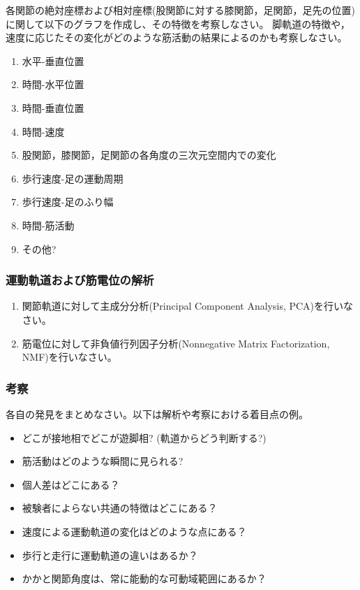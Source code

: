 \documentclass{jarticle}
\begin{document}
各関節の絶対座標および相対座標(股関節に対する膝関節，足関節，足先の位置)に関して以下のグラフを作成し、その特徴を考察しなさい。
脚軌道の特徴や，速度に応じたその変化がどのような筋活動の結果によるのかも考察しなさい。
\begin{enumerate}
\item 水平-垂直位置
\item 時間-水平位置
\item 時間-垂直位置
\item 時間-速度
\item 股関節，膝関節，足関節の各角度の三次元空間内での変化
\item 歩行速度-足の運動周期
\item 歩行速度-足のふり幅
\item 時間-筋活動
\item その他?
\end{enumerate}

\subsubsection{運動軌道および筋電位の解析}

\begin{enumerate}
  \item 関節軌道に対して主成分分析(Principal Component Analysis, PCA)を行いなさい。
  \item 筋電位に対して非負値行列因子分析(Nonnegative Matrix Factorization, NMF)を行いなさい。
\end{enumerate}

\subsubsection{考察}
各自の発見をまとめなさい。以下は解析や考察における着目点の例。

\begin{itemize}
\item どこが接地相でどこが遊脚相? (軌道からどう判断する?)
\item 筋活動はどのような瞬間に見られる?
\item 個人差はどこにある？
\item 被験者によらない共通の特徴はどこにある？
\item 速度による運動軌道の変化はどのような点にある？
\item 歩行と走行に運動軌道の違いはあるか？
\item かかと関節角度は、常に能動的な可動域範囲にあるか？
\end{itemize}
\end{document}
